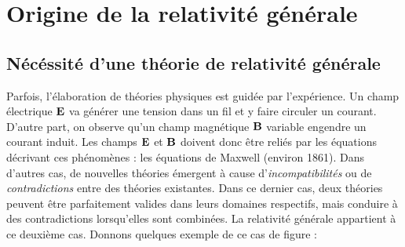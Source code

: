 \cutebreak
\section{Origine de la relativité générale}


\subsection{Nécéssité d'une théorie de relativité générale}
Parfois, l'élaboration de théories physiques est guidée par l'expérience. Un champ électrique $\bm{\mathrm{E}}$ va générer une tension dans un fil et y faire circuler un courant. D'autre part, on observe qu'un champ magnétique $\bm{\mathrm{B}}$ variable engendre un courant induit. Les champs $\bm{\mathrm{E}}$ et $\bm{\mathrm{B}}$ doivent donc être reliés par les équations décrivant ces phénomènes : les équations de Maxwell (environ 1861).
Dans d'autres cas, de nouvelles théories émergent à cause d'\emph{incompatibilités} ou de \emph{contradictions} entre des théories existantes. Dans ce dernier cas, deux théories peuvent être parfaitement valides dans leurs domaines respectifs, mais conduire à des contradictions lorsqu'elles sont combinées. La relativité générale appartient à ce deuxième cas. Donnons quelques exemple de ce cas de figure :


